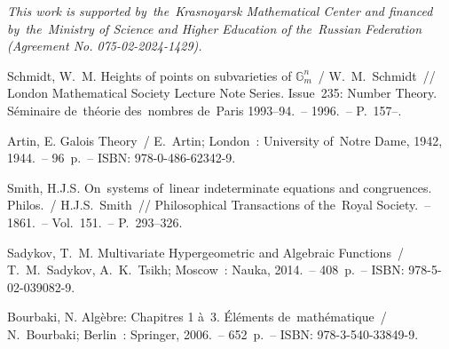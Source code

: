 \documentclass[twoside]{article}
\begin{document}
\medskip

\emph{This work is supported by~the~Krasnoyarsk Mathematical Center and financed
by~the~Ministry of Science and Higher Education of the~Russian Federation (Agreement No. 075-02-2024-1429).}

\bigskip

\begin{thebibliography}{9}

 Schmidt, W.~M. Heights of points on subvarieties of $\mathbb{G}^n_m$~/ W.~M.~{Sch\-midt}~//
London Mathematical Society Lecture Note Series. Issue~235: Number Theory.
S\'eminaire de~th\'eorie des~nombres de~Paris 1993--94.~-- 1996.~-- P.~157--.

 Artin, E. Galois Theory~/ E.~Artin; London~: University of~Notre Dame, 1942, 1944.~-- 96~p.~-- ISBN: 978-0-486-62342-9.

 Smith, H.J.S. On~systems of~linear indeterminate equations and {con\-gru\-ences}. Philos.~/ H.J.S.~Smith~//
Philosophical Transactions of the~Royal Society.~-- 1861.~-- Vol.~151.~-- P.~293--326.

 Sadykov, T.~M. Multivariate Hypergeometric and Algebraic Functions~/ T.~M.~Sadykov, A.~K.~Tsikh;
Moscow~: Nauka, 2014.~-- 408~p.~-- ISBN: 978-5-02-039082-9.

 Bourbaki, N. Alg\`ebre: Chapitres 1 \`a~3. \'El\'ements de~math\'ematique~/ N.~Bourbaki; Berlin~: Springer, 2006.~-- 652~p.~-- ISBN: 978-3-540-33849-9.

\end{thebibliography}

\makeRusTit   %
\end{document}

